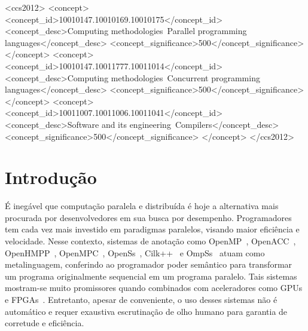 \documentclass[sigplan,10pt,review]{acmart}
\begin{document}
 \begin{CCSXML}
<ccs2012>
<concept>
<concept_id>10010147.10010169.10010175</concept_id>
<concept_desc>Computing methodologies~Parallel programming languages</concept_desc>
<concept_significance>500</concept_significance>
</concept>
<concept>
<concept_id>10010147.10011777.10011014</concept_id>
<concept_desc>Computing methodologies~Concurrent programming languages</concept_desc>
<concept_significance>500</concept_significance>
</concept>
<concept>
<concept_id>10011007.10011006.10011041</concept_id>
<concept_desc>Software and its engineering~Compilers</concept_desc>
<concept_significance>500</concept_significance>
</concept>
</ccs2012>
\end{CCSXML}



\maketitle

\section{Introdu\c{c}\~{a}o}
\label{sec:intro}

É inegável que computação paralela e distribuída é hoje a alternativa mais procurada por 
desenvolvedores em sua busca por desempenho. Programadores tem cada vez mais investido
em paradigmas paralelos, visando maior eficiência e velocidade. Nesse contexto, sistemas de
anotação como OpenMP~\cite{JaegerCP15},
OpenACC~\cite{OpenACC20}, OpenHMPP~\cite{Andion14}, OpenMPC~\cite{Lee10},
OpenSs~\cite{MeenderinckJ11}, Cilk++~\cite{Leiserson09} e
OmpSs~\cite{duran:ppl:2011}
atuam como metalinguagem, conferindo ao programador
poder semântico para transformar um programa originalmente sequencial
em um programa paralelo. Tais sistemas mostram-se muito promissores quando
combinados com aceleradores como GPUs e FPGAs~\cite{Mendonca17,Poesia17}.
Entretanto, apesar de conveniente, o uso desses sistemas não é automático e
requer exaustiva escrutinação de olho humano para garantia de corretude e eficiência.
\end{document}
